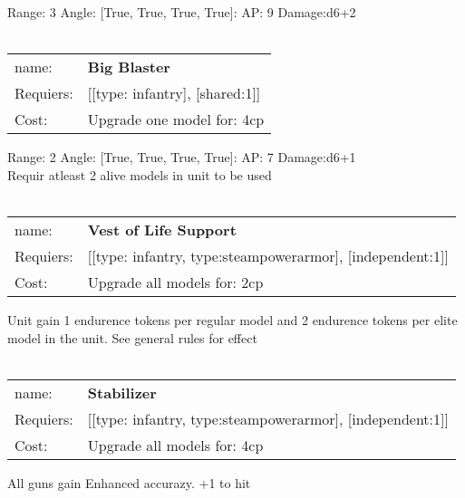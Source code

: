 Range: 3  Angle: [True, True, True, True]: AP: 9 Damage:d6+2 \\








\ \\
\begin{tabular}{ll}
name: & {\bf Big Blaster } \\
Requiers: & [[type: infantry], [shared:1]] \\
Cost: & Upgrade one model for: 4cp \\
\end{tabular}



Range: 2  Angle: [True, True, True, True]: AP: 7 Damage:d6+1 \\
Requir atleast 2 alive models in unit to be used\\ 








\ \\
\begin{tabular}{ll}
name: & {\bf Vest of Life Support } \\
Requiers: & [[type: infantry, type:steampowerarmor], [independent:1]] \\
Cost: & Upgrade all models for: 2cp \\
\end{tabular}

Unit gain 1 endurence tokens per regular model  and 2 endurence tokens per elite model in the unit. See general rules for effect\\ 









\ \\
\begin{tabular}{ll}
name: & {\bf Stabilizer } \\
Requiers: & [[type: infantry, type:steampowerarmor], [independent:1]] \\
Cost: & Upgrade all models for: 4cp \\
\end{tabular}

All guns gain Enhanced accurazy. +1 to hit\\ 








